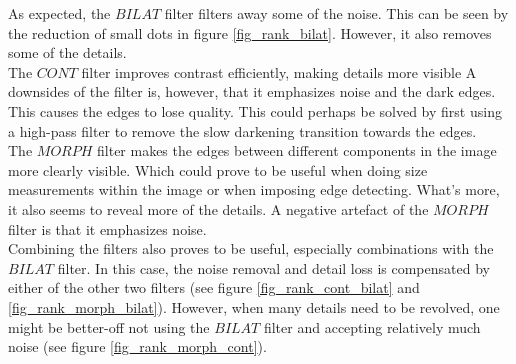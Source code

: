 As expected, the $BILAT$ filter filters away some of the noise. This can be seen by the reduction of small dots in figure \ref{fig_rank_bilat}. However, it also removes some of the details. \\
The $CONT$ filter improves contrast efficiently, making details more visible A downsides of the filter is, however, that it emphasizes noise and the dark edges. This causes the edges to lose quality. This could perhaps be solved by first using a high-pass filter to remove the slow darkening transition towards the edges. \\
The $MORPH$ filter makes the edges between different components in the image more clearly visible. Which could prove to be useful when doing size measurements within the image or when imposing edge detecting. What's more, it also seems to reveal more of the details. A negative artefact of the $MORPH$ filter is that it emphasizes noise. \\
Combining the filters also proves to be useful, especially combinations with the $BILAT$ filter. In this case, the noise removal and detail loss is compensated by either of the other two filters (see figure \ref{fig_rank_cont_bilat} and \ref{fig_rank_morph_bilat}). However, when many details need to be revolved, one might be better-off not using the $BILAT$ filter and accepting relatively much noise (see figure \ref{fig_rank_morph_cont}). 


